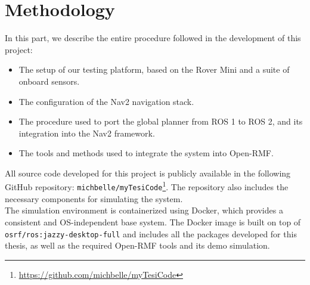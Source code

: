 \part{Methodology}
In this part, we describe the entire procedure followed in the development of this project:
\begin{itemize}
	\item The setup of our testing platform, based on the Rover Mini and a suite of onboard sensors.
	\item The configuration of the Nav2 navigation stack.
	\item The procedure used to port the global planner from ROS 1 to ROS 2, and its integration into the Nav2 framework.
	\item The tools and methods used to integrate the system into Open-RMF.
\end{itemize}
All source code developed for this project is publicly available in the following GitHub repository: \texttt{michbelle/myTesiCode}\footnote{\href{https://github.com/michbelle/myTesiCode}{https://github.com/michbelle/myTesiCode}}. The repository also includes the necessary components for simulating the system.\\
The simulation environment is containerized using Docker, which provides a consistent and OS-independent base system. The Docker image is built on top of \texttt{osrf/ros:jazzy-desktop-full} and includes all the packages developed for this thesis, as well as the required Open-RMF tools and its demo simulation.\\



